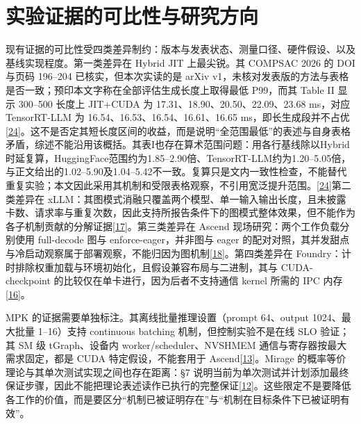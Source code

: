 \documentclass[
  UTF8,
  zihao=5]{ctexart}
\begin{document}
\hypertarget{ux5b9eux9a8cux8bc1ux636eux7684ux53efux6bd4ux6027ux4e0eux7814ux7a76ux65b9ux5411}{%
\section{实验证据的可比性与研究方向}\label{ux5b9eux9a8cux8bc1ux636eux7684ux53efux6bd4ux6027ux4e0eux7814ux7a76ux65b9ux5411}}

现有证据的可比性受四类差异制约：版本与发表状态、测量口径、硬件假设、以及基线实现程度。第一类差异在
Hybrid JIT 上最尖锐。其 COMPSAC 2026 的 DOI 与页码 196--204
已核实，但本次实读的是 arXiv
v1，未核对发表版的方法与表格是否一致；预印本文字称在全部评估生成长度上取得最低
P99，而其 Table II 显示 300--500 长度上 JIT+CUDA 为
17.31、18.90、20.50、22.09、23.68 ms，对应 TensorRT-LLM 为
16.54、16.53、16.54、16.61、16.65
ms，即长生成段并不占优{[}\protect\hyperlink{ref-yadav2026hybridpreprint}{24}{]}。这不是否定其短长度区间的收益，而是说明``全范围最低''的表述与自身表格矛盾，综述不能沿用该概括。其表I也存在算术范围问题：用各行基线除以Hybrid时延复算，HuggingFace范围约为1.85--2.90倍、TensorRT-LLM约为1.20--5.05倍，与正文给出的1.02--5.90及1.04--5.42不一致。复算只是文内一致性检查，不能替代重复实验；本文因此采用其机制和受限表格观察，不引用宽泛提升范围。{[}\protect\hyperlink{ref-yadav2026hybridpreprint}{24}{]}第二类差异在
xLLM：其图模式消融只覆盖两个模型、单一输入输出长度，且未披露卡数、请求率与重复次数，因此支持所报告条件下的图模式整体效果，但不能作为各子机制贡献的分解证据{[}\protect\hyperlink{ref-liu2025xllm}{17}{]}。第三类差异在
Ascend 现场研究：两个工作负载分别使用 full-decode 图与
enforce-eager，并非图与 eager
的配对对照，其并发甜点与冷启动观察属于部署观察，不能归因为图机制{[}\protect\hyperlink{ref-yu2026ascendfield}{18}{]}。第四类差异在
Foundry：计时排除权重加载与环境初始化，且假设兼容布局与二进制，其与
CUDA-checkpoint 的比较仅在单卡进行，因为后者不支持通信 kernel 所需的 IPC
内存{[}\protect\hyperlink{ref-liu2026foundry}{16}{]}。

MPK 的证据需要单独标注。其离线批量推理设置（prompt 64、output
1024、最大批量 1--16）支持 continuous batching 机制，但控制实验不是在线
SLO 验证；其 SM 级 tGraph、设备内 worker/scheduler、NVSHMEM
通信与寄存器按最大需求固定，都是 CUDA 特定假设，不能套用于
Ascend{[}\protect\hyperlink{ref-cheng2026mpk}{13}{]}。Mirage
的概率等价理论与其单次测试实现之间也存在距离：§7
说明当前为单次测试并计划添加最终保证步骤，因此不能把理论表述读作已执行的完整保证{[}\protect\hyperlink{ref-wu2025mirage}{12}{]}。这些限定不是要降低各工作的价值，而是要区分``机制已被证明存在''与``机制在目标条件下已被证明有效''。
\end{document}
